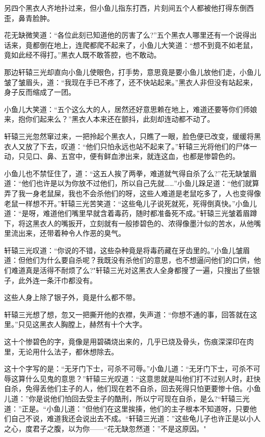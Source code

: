 \documentclass[12pt,oneside]{book}
\begin{document}
另四个黑衣人齐地扑过来，但小鱼儿指东打西，片刻间五个人都被他打得东倒西歪，鼻青脸肿。

花无缺微笑道：``各位此刻已知道他的厉害了么?''五个黑衣人哪里还有一个说得出话来，竟都倒在地上，连爬都爬不起来了，小鱼儿大笑道：``想不到竟不如老鼠，竟如此经不得打。''黑衣人既不敢答腔，也不敢动。

那边轩辕三光却直向小鱼儿使眼色，打手势，意思竟是要小鱼儿放他们走，小鱼儿皱了皱眉头，道：``我现在手已不疼了，还不快站起来。''黑衣人非但没有站起来，身子反而缩成了一团。

小鱼儿大笑道：``五个这么大的人，居然还好意思赖在地上，难道还要等你们师娘来，抱你们起来么？''黑衣人本来还在颤抖，此刻却连动都不动了。

轩辕三光忽然窜过来，一把拎起个黑衣人，只瞧了一眼，脸色便已改变，缓缓将黑衣人又放了下去，叹道：``他们只怕永远也站不起来了。''轩辕三光将他们的尸体一动，只见口、鼻、五宫中，便有鲜血渗出来，就连这血，也都是惨碧色的。

小鱼儿也不禁怔住了，道：``这五人挨了两拳，难道就气得自杀了么?''花无缺皱眉道：``他们也许是以为你放不过他们，所以自己先就\ldots\ldots{}''小鱼儿跺足道：``他们就算弄了我一身老鼠屎，我也不会杀他们的呀，这些人难道是老鼠吃多了，人也变得像老鼠一样想不开。''轩辕三光苦笑道：``这些龟儿子说死就死，死得倒真快。''小鱼儿道：``是呀，难道他们嘴里早就含着毒药，随时都准备死不成。''轩辕三光皱着眉蹲下，将这黑衣人的嘴扳开，立刻就有一般掺碧色的、浓得像墨汁似的苦水，从他嘴里流出来，还带着种令人作恶的臭气。

轩辕三光叹道：``你说的不错，这些杂种竟是将毒药藏在牙齿里的。''小鱼儿皱眉道：但他们为什么要自杀呢？我既没有杀他们的意思，也不想逼问他们的口供，他们难道真是活得不耐烦了么?"轩辕三光对这黑衣人全身都搜了一遍，只搜出了些银子，此外连一条汗巾都没有。

这些人身上除了银子外，竟是什么都不带。

轩辕三光想了想，忽又一把撕开他的衣襟，失声道：``你想不通的事，回答就在这里。''只见这黑衣人胸膛上，赫然有十个大字。

这十个惨碧色的字，竟像是用碧磷烧出来的，几乎已烧及骨头，伤痕深深印在肉里，无论用什么法子，都休想除去。

这十个字写的是：``无牙门下士，可杀不可辱。''小鱼儿道：``无牙门下士，可杀不可辱这算什么见鬼的意思？''轩辕三光叹道：``这意思就是叫他们打不过别人时，赶快自杀，免得丢他们主子的人，他们现在若不自杀，回去死得只怕更要惨十倍。小鱼儿道：''你是说他们怕回去受主子的酷刑，所以宁可现在自杀，是么?``轩辕三光道：''正是。``小鱼儿道：''但他们在这里挨揍，他们的主子根本不知道呀，只要他们自己不说，难道我还会说出去不成。``轩辕三光道：''这些龟儿子也许正是以小人之心，度君子之腹，以为你------``花无缺忽然道：''不是这原因。"
\end{document}
